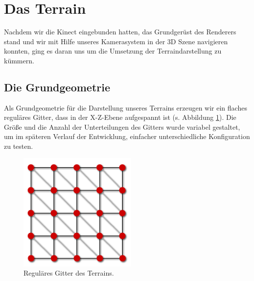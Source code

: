 \section{Das Terrain}
\begin{Spacing}{\mylinespace}

Nachdem wir die Kinect eingebunden hatten, das Grundgerüst des Renderers stand und wir mit Hilfe unseres Kamerasystem in der 3D Szene navigieren konnten, ging es daran uns um die Umsetzung der Terraindarstellung zu kümmern.

\subsection{Die Grundgeometrie}
Als Grundgeometrie für die Darstellung unseres Terrains erzeugen wir ein flaches reguläres Gitter, dass in der X-Z-Ebene aufgespannt ist (s. Abbildung \ref{fig:grid}). Die Größe und die Anzahl der Unterteilungen des Gitters wurde variabel gestaltet, um im späteren Verlauf der Entwicklung, einfacher unterschiedliche Konfiguration zu testen. 

\begin{figure}[h!]
	\centering
	\vspace*{10px}
	\includegraphics[width=220px]{graphics/grid.png}
	\caption{Reguläres Gitter des Terrains.}
	\label{fig:grid}
\end{figure}


\end{Spacing}
